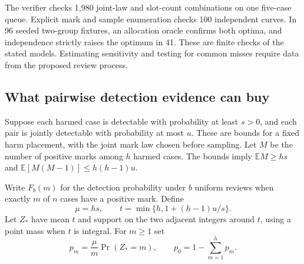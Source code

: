 \documentclass[11pt]{article}
\begin{document}
The verifier checks 1,980 joint-law and slot-count combinations
on one five-case queue. Explicit mark and sample enumeration
checks 100 independent curves. In 96 seeded two-group fixtures,
an allocation oracle confirms both optima, and independence
strictly raises the optimum in 41. These are finite checks of
the stated models. Estimating sensitivity and testing for common
misses require data from the proposed review process.

\subsection{What pairwise detection evidence can buy}
Suppose each harmed case is detectable with probability at least
$s>0$, and each pair is jointly detectable with probability at
most $u$. These are bounds for a fixed harm placement, with the
joint mark law chosen before sampling. Let $M$ be the number of
positive marks among $h$ harmed cases. The bounds imply
$\mathbb E M\ge hs$ and $\mathbb E[M(M-1)]\le h(h-1)u$.

Write $F_b(m)$ for the detection probability under $b$ uniform
reviews when exactly $m$ of $n$ cases have a positive mark. Define
\[
 \mu=hs,\qquad t=\min\{h,1+(h-1)u/s\}.
\]
Let $Z_*$ have mean $t$ and support on the two adjacent integers
around $t$, using a point mass when $t$ is integral. For $m\ge1$ set
\[
 p_m=\frac{\mu}{m}\Pr(Z_*=m),\qquad p_0=1-\sum_{m=1}^h p_m.
\]
\end{document}
